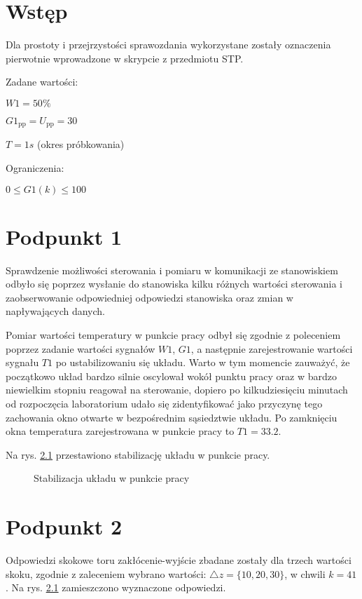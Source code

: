 \chapter{Wstęp}
Dla prostoty i przejrzystości sprawozdania wykorzystane zostały oznaczenia pierwotnie wprowadzone w skrypcie z przedmiotu STP.

\bigskip

Zadane wartości:

\smallskip

$W1=50\%$

\smallskip

$G1_{\mathrm{pp}}=U_{\mathrm{pp}}=30$

\smallskip

$T=1s$ (okres próbkowania)

\bigskip

Ograniczenia:

\smallskip

$0 \le G1(k) \le 100$

\chapter{Podpunkt 1}
Sprawdzenie możliwości sterowania i pomiaru w komunikacji ze stanowiskiem odbyło się poprzez wysłanie do stanowiska kilku różnych wartości sterowania i zaobserwowanie odpowiedniej odpowiedzi stanowiska oraz zmian w napływających danych.

Pomiar wartości temperatury w punkcie pracy odbył się zgodnie z poleceniem poprzez zadanie wartości sygnałów $W1$, $G1$, a następnie zarejestrowanie wartości sygnału $T1$ po ustabilizowaniu się układu. Warto w tym momencie zauważyć, że początkowo układ bardzo silnie oscylował wokół punktu pracy oraz w bardzo niewielkim stopniu reagował na sterowanie, dopiero po kilkudziesięciu minutach od rozpoczęcia laboratorium udało się zidentyfikować jako przyczynę tego zachowania okno otwarte w bezpośrednim sąsiedztwie układu. Po zamknięciu okna temperatura zarejestrowana w punkcie pracy to $T1=\num{33,2}$.

Na rys. \ref{R1} przestawiono stabilizację układu w punkcie pracy.

\begin{figure}[ht]
\centering

\caption{Stabilizacja układu w punkcie pracy}
\label{R1}
\end{figure}

\chapter{Podpunkt 2}
Odpowiedzi skokowe toru zakłócenie-wyjście zbadane zostały dla trzech wartości skoku, zgodnie z zaleceniem wybrano wartości: $\triangle z = \{10, 20, 30\}$, w chwili $k=\num{41}$. Na rys. \ref{R1} zamieszczono wyznaczone odpowiedzi.

